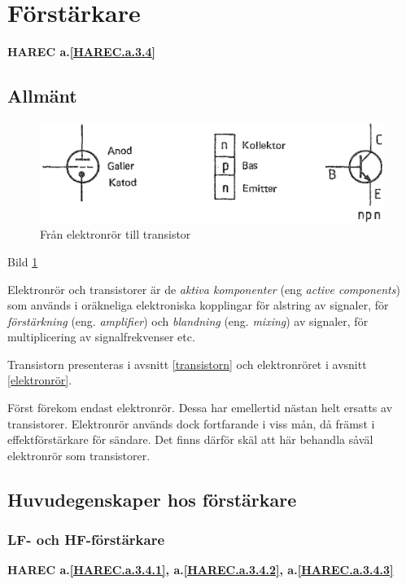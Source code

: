 \section{Förstärkare}
\textbf{HAREC a.\ref{HAREC.a.3.4}\label{myHAREC.a.3.4}}

\subsection{Allmänt}

\begin{figure}
\includegraphics[width=\textwidth]{images/cropped_pdfs/bild_2_3-40.pdf}
\caption{Från elektronrör till transistor}
\label{fig:BildII3-40}
\end{figure}

Bild \ref{fig:BildII3-40}

Elektronrör och transistorer är de \emph{aktiva komponenter} (eng
\emph{active components}) som används i oräkneliga elektroniska kopplingar för
alstring av signaler, för \emph{förstärkning} (eng. \emph{amplifier}) och
\emph{blandning} (eng. \emph{mixing}) av signaler, för multiplicering av
signalfrekvenser etc.

Transistorn presenteras i avsnitt \ref{transistorn} och elektronröret i avsnitt \ref{elektronrör}.

Först förekom endast elektronrör. Dessa har emellertid nästan helt
ersatts av transistorer.
Elektronrör används dock fortfarande i viss mån, då främst i
effektförstärkare för sändare.
Det finns därför skäl att här behandla såväl elektronrör som transistorer.

\subsection{Huvudegenskaper hos förstärkare}
\subsubsection{LF- och HF-förstärkare}
\textbf{HAREC a.\ref{HAREC.a.3.4.1}, a.\ref{HAREC.a.3.4.2}, a.\ref{HAREC.a.3.4.3}\label{myHAREC.a.3.4.1}\label{myHAREC.a.3.4.2}\label{myHAREC.a.3.4.3}}

